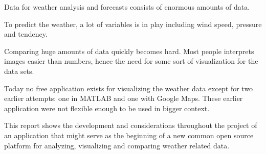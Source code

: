 Data for weather analysis and forecasts consists of enormous amounts of data.

To predict the weather, a lot of variables is in play including wind speed, pressure and tendency.

Comparing huge amounts of data quickly becomes hard. Most people interprets images easier than numbers, hence the need for some sort of visualization for the data sets.

Today no free application exists for visualizing the weather data except for two earlier attempts: one in MATLAB and one with Google Maps. These earlier application were not flexible enough to be used in bigger context.

This report shows the development and considerations throughout the project of an application that might serve as the beginning of a new common open source platform for analyzing, visualizing and comparing weather related data.
